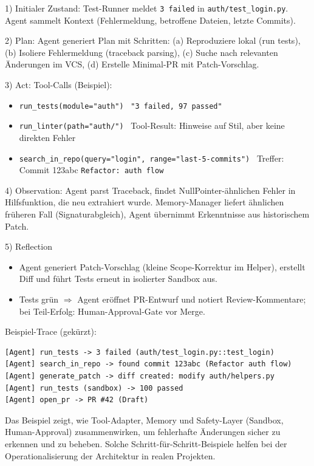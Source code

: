 1) Initialer Zustand: Test-Runner meldet \texttt{3 failed} in \texttt{auth/test\_login.py}. Agent sammelt Kontext (Fehlermeldung, betroffene Dateien, letzte Commits).

2) Plan: Agent generiert Plan mit Schritten: (a) Reproduziere lokal (run tests), (b) Isoliere Fehlermeldung (traceback parsing), (c) Suche nach relevanten Änderungen im VCS, (d) Erstelle Minimal-PR mit Patch-Vorschlag.

3) Act: Tool-Calls (Beispiel):
\begin{itemize}
  \item \texttt{run\_tests(module="auth")} \textrightarrow\ \texttt{"3 failed, 97 passed"}
  \item \texttt{run\_linter(path="auth/")} \textrightarrow\ Tool-Result: Hinweise auf Stil, aber keine direkten Fehler
  \item \texttt{search\_in\_repo(query="login", range="last-5-commits")} \textrightarrow\ Treffer: Commit 123abc \texttt{Refactor: auth flow}
\end{itemize}

4) Observation: Agent parst Traceback, findet NullPointer-ähnlichen Fehler in Hilfsfunktion, die neu extrahiert wurde. Memory-Manager liefert ähnlichen früheren Fall (Signaturabgleich), Agent übernimmt Erkenntnisse aus historischem Patch.

5) Reflection 
\begin{sloppypar}
\begin{itemize}
  \item Agent generiert Patch-Vorschlag (kleine Scope-Korrektur im Helper), erstellt Diff und führt Tests erneut in isolierter Sandbox aus.
  \item Tests grün $\Rightarrow$ Agent eröffnet PR-Entwurf und notiert Review-Kommentare; bei Teil-Erfolg: Human-Approval-Gate vor Merge.
\end{itemize}
\end{sloppypar}

Beispiel-Trace (gekürzt):
\begin{lstlisting}[breaklines=true, basicstyle=\ttfamily\small]
[Agent] run_tests -> 3 failed (auth/test_login.py::test_login)
[Agent] search_in_repo -> found commit 123abc (Refactor auth flow)
[Agent] generate_patch -> diff created: modify auth/helpers.py
[Agent] run_tests (sandbox) -> 100 passed
[Agent] open_pr -> PR #42 (Draft)
\end{lstlisting}

Das Beispiel zeigt, wie Tool-Adapter, Memory und Safety-Layer (Sandbox, Human-Approval) zusammenwirken, um fehlerhafte Änderungen sicher zu erkennen und zu beheben. Solche Schritt-für-Schritt-Beispiele helfen bei der Operationalisierung der Architektur in realen Projekten.

